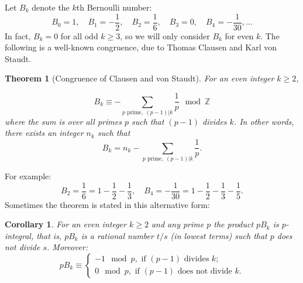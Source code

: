 \documentclass[12pt]{article}
\newtheorem*{thm}{Theorem}
\newtheorem*{cor}{Corollary}
\theoremstyle{definition}
\newcommand{\Ints}{\mathbb{Z}}
\begin{document}
Let $B_k$ denote the $k$th Bernoulli number:
$$B_0=1,\quad B_1=-\frac{1}{2},\quad B_2=\frac{1}{6},\quad B_3=0,\quad B_4=-\frac{1}{30},\ldots$$
In fact, $B_k=0$ for all odd $k\geq 3$, so we will only consider $B_k$ for even $k$. The following is a well-known congruence, due to Thomas Clausen and Karl von Staudt.

\begin{thm}[Congruence of Clausen and von Staudt]

For an even integer $k\geq 2$,

$$B_k \equiv -\sum_{p \text{ prime},\ (p-1)|k} \frac{1}{p} \mod \Ints$$
where the sum is over all primes $p$ such that $(p-1)$ divides $k$. In other words, there exists an integer $n_k$ such that 
$$B_k=n_k -\sum_{p \text{ prime},\ (p-1)|k} \frac{1}{p}.$$
\end{thm}

For example:
$$B_2=\frac{1}{6}=1-\frac{1}{2}-\frac{1}{3}, \quad B_4=-\frac{1}{30}=1-\frac{1}{2}-\frac{1}{3}-\frac{1}{5}.$$
Sometimes the theorem is stated in this alternative form:

\begin{cor}
For an even integer $k\geq 2$ and any prime $p$ the product $pB_k$ is $p$-integral, that is, $pB_k$ is a rational number $t/s$ (in lowest terms) such that $p$ does not divide $s$. Moreover:
$$pB_k \equiv \begin{cases}
-1 \mod p, \text{ if $(p-1)$ divides $k$;}\\
0 \mod p, \text{ if $(p-1)$ does not divide $k$}.
\end{cases}$$ 
\end{cor}
\end{document}
